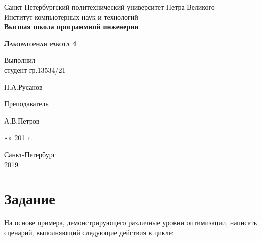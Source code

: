 \documentclass[a4paper,12pt]{article}
\begin{document}
    \thispagestyle{empty}	%
    
    \begin{center}
	Санкт-Петербургский политехнический университет Петра Великого\\
	Институт компьютерных наук и технологий\\
	\bfseries{Высшая школа программной инженерии}
\end{center}

\vspace{20ex} %
    
    
    \begin{center}
	\begin{huge} {\bfseries{\scshape Лабораторная работа 4}} \end{huge}
\end{center}

\vspace{30ex}

\noindent Выполнил\\
студент гр.13534/21\hfill \begin{minipage}{0.6\textwidth} \hfill Н.А.Русанов\end{minipage}

\vspace{3ex}

\noindent Преподаватель\hfill \begin{minipage} {0.6\textwidth}\hfill А.В.Петров\end{minipage}

\vspace{3ex}

\hfill \begin{minipage}{0.6\textwidth} \hfill «\underline{\hspace{1cm}}»\underline{\hspace{3cm}} 201\underline{\hspace{0.5cm}} г.\end{minipage}

\vfill

\begin{center}
	Санкт-Петербург\\ 
	2019
\end{center}
    \section*{Задание}


    На основе примера, демонстрирующего различные уровни оптимизации, написать
    сценарий, выполняющий следующие действия в цикле:
\end{document}
